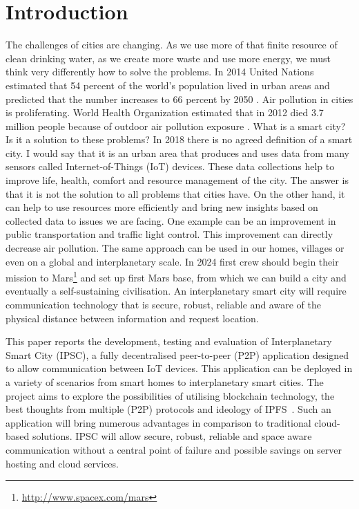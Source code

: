 \chapter{Introduction\label{chap:introduction}}
\quad The challenges of cities are changing. As we use more of that finite resource of clean drinking water, as we create more waste and use more energy, we must think very differently how to solve the problems. In 2014 United Nations estimated that 54 percent of the world's population lived in urban areas and predicted that the number increases to 66 percent by 2050 \cite{noauthor_worlds_2014}. Air pollution in cities is proliferating. World Health Organization estimated that in 2012 died 3.7 million people because of outdoor air pollution exposure \cite{noauthor_who_2014}. What is a smart city? Is it a solution to these problems? In 2018 there is no agreed definition of a smart city. I would say that it is an urban area that produces and uses data from many sensors called Internet-of-Things (IoT) devices. These data collections help to improve life, health, comfort and resource management of the city. The answer is that it is not the solution to all problems that cities have. On the other hand, it can help to use resources more efficiently and bring new insights based on collected data to issues we are facing. One example can be an improvement in public transportation and traffic light control. This improvement can directly decrease air pollution. The same approach can be used in our homes, villages or even on a global and interplanetary scale. In 2024 first crew should begin their mission to Mars\footnote{\url{http://www.spacex.com/mars}} and set up first Mars base, from which we can build a city and eventually a self-sustaining civilisation. An interplanetary smart city will require communication technology that is secure, robust, reliable and aware of the physical distance between information and request location.
\vspace{\baselineskip}

This paper reports the development, testing and evaluation of Interplanetary Smart City (IPSC), a fully decentralised peer-to-peer (P2P) application designed to allow communication between IoT devices. This application can be deployed in a variety of scenarios from smart homes to interplanetary smart cities. The project aims to explore the possibilities of utilising blockchain technology, the best thoughts from multiple (P2P) protocols and ideology of IPFS~\cite{labs_ipfs_nodate}. Such an application will bring numerous advantages in comparison to traditional cloud-based solutions. IPSC will allow secure, robust, reliable and space aware communication without a central point of failure and possible savings on server hosting and cloud services.

